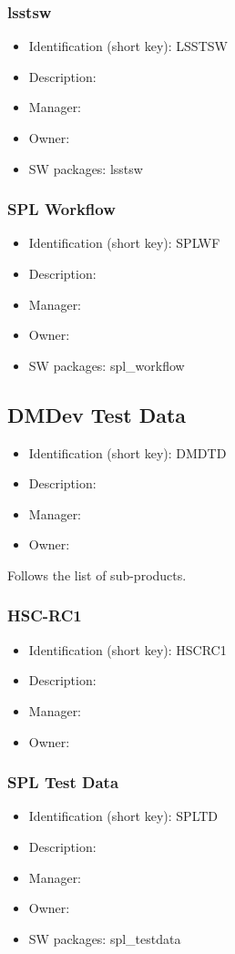 \subsubsection{lsstsw}\label{sect:LSSTSW}
\begin{itemize}
\item Identification (short key): LSSTSW
\item Description: 
\item Manager: 
\item Owner: 
\item SW packages: lsstsw
\end{itemize}

\subsubsection{SPL Workflow}\label{sect:SPLWF}
\begin{itemize}
\item Identification (short key): SPLWF
\item Description: 
\item Manager: 
\item Owner: 
\item SW packages: spl\_workflow
\end{itemize}

\subsection{DMDev Test Data}\label{sect:DMDTD}
\begin{itemize}
\item Identification (short key): DMDTD
\item Description: 
\item Manager: 
\item Owner: 
\end{itemize}

Follows the list of sub-products.\subsubsection{HSC-RC1}\label{sect:HSCRC1}
\begin{itemize}
\item Identification (short key): HSCRC1
\item Description: 
\item Manager: 
\item Owner: 
\end{itemize}

\subsubsection{SPL Test Data}\label{sect:SPLTD}
\begin{itemize}
\item Identification (short key): SPLTD
\item Description: 
\item Manager: 
\item Owner: 
\item SW packages: spl\_testdata
\end{itemize}


